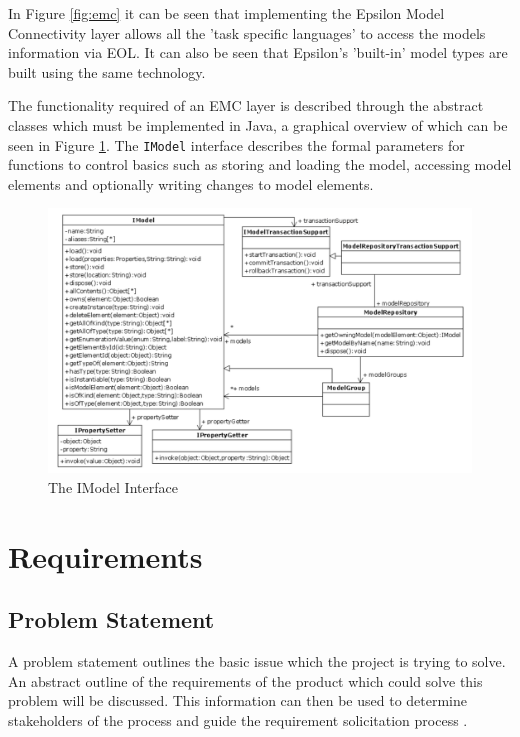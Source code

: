 \documentclass[11pt]{book}
\newcommand{\code}[1]{\texttt{#1}}
\begin{document}
In Figure \ref{fig:emc} it can be seen that implementing the Epsilon Model Connectivity layer allows all the 'task specific languages' to access the models information via EOL. It can also be seen that Epsilon's 'built-in' model types are built using the same technology.

The functionality required of an EMC layer is described through the abstract classes which must be implemented in Java, a graphical overview of which can be seen in Figure \ref{fig:imodelinterface}. The \code{IModel} interface describes the formal parameters for functions to control basics such as storing and loading the model, accessing model elements and optionally writing changes to model elements.

\begin{figure}[H]
	\centering
	\includegraphics[width=\textwidth]{images/imodel-interface}
	\caption{The IModel Interface \cite{theepsilonbook}}
	\label{fig:imodelinterface}
\end{figure}

\chapter{Requirements}
\label{requirements}

\section{Problem Statement}
\label{problemstatement}
A problem statement outlines the basic issue which the project is trying to solve. An abstract outline of the requirements of the product which could solve this problem will be discussed. This information can then be used to determine stakeholders of the process and guide the requirement solicitation process \cite{problemstatement}.
\end{document}
